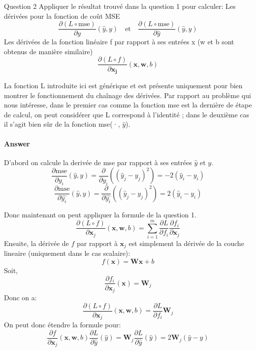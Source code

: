 \documentclass[12pt,a4paper]{article}
\begin{document}
\begin{section}{Question 2}
Appliquer le résultat trouvé dans la question 1 pour calculer: \newline
Les dérivées pour la fonction de coût MSE
\[
\frac{\partial (L\circ \text{mse})}{\partial y}(\hat{y}, y)
\quad \text{et} \quad
\frac{\partial (L\circ \text{mse})}{\partial \hat{y}}(\hat{y}, y)
\]
Les dérivées de la fonction linéaire f par rapport à ses entrées x (w et b sont
obtenus de manière similaire)
\[\frac{\partial (L\circ f)}{\partial \mathbf{x_j}}(\mathbf{x}, \mathbf{w}, b)\]

La fonction L introduite ici est générique et est présente uniquement pour bien montrer 
le fonctionnement du chaînage des dérivées. Par rapport au problème qui nous
intéresse, dans le premier cas comme la fonction mse est la dernière de étape de calcul, on peut considérer que L correspond à l'identité ; dans le deuxième cas il s'agit
bien sûr de la fonction mse(·, $\hat{y}$).

\paragraph{Answer}
D'abord on calcule la derivée de mse par rapport à ses entrées \(\hat{y}\) et \(y\).
\[
\frac{\partial \text{mse}}{\partial y_i}(\hat{y}, y) = \frac{\partial}{\partial y_i} \left( (\hat{y}_j - y_j)^2 \right) = -2(\hat{y}_i - y_i)
\]
\[
\frac{\partial \text{mse}}{\partial \hat{y_i}}(\hat{y}, y) = \frac{\partial}{\partial \hat{y_i}} \left( (\hat{y}_j - y_j)^2 \right) = 2(\hat{y}_i - y_i)
\]

Donc maintenant on peut appliquer la formule de la question 1.
\[
\frac{\partial (L \circ f)}{\partial \mathbf{x}_j}(\mathbf{x}, \mathbf{w}, b) =
\sum_{i=1}^{m} \frac{\partial L}{\partial f_i}\frac{\partial f_i}{\partial \mathbf{x}_j}
\]
Ensuite, la dérivée de \(f\) par rapport à \(\mathbf{x}_j\) est simplement la dérivée de la couche lineaire (uniquement dans le cas scalaire):
\[
f(\mathbf{x}) = \mathbf{W}\mathbf{x} + b
\]
Soit,
\[
\frac{\partial f_i}{\partial \mathbf{x}_j}(\mathbf{x}) = \mathbf{W}_{j}
\]
Donc on a:
\[
\frac{\partial (L \circ f)}{\partial \mathbf{x}_j}(\mathbf{x}, \mathbf{w}, b) =
\frac{\partial L}{\partial f_i} \mathbf{W}_{j} 
\]
On peut donc étendre la formule pour:
\[
\frac{\partial f}{\partial \mathbf{x}_j}(\mathbf{x}, \mathbf{w}, b) \frac{\partial L}{\partial \hat{y}}(\hat{y}) =
\mathbf{W}_j \frac{\partial L}{\partial \hat{y}}(\hat{y}) =
2 \mathbf{W}_j (\hat{y} - y)
\]

\end{section}
\end{document}
